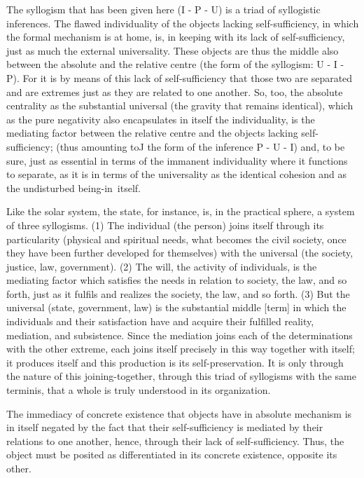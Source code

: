 The syllogism that has been given here (I - P - U)
is a triad of syllogistic inferences.
The flawed individuality of the objects lacking self-sufficiency,
in which the formal mechanism is at home, is,
in keeping with its lack of self-sufficiency,
just as much the external universality.
These objects are thus the middle also
between the absolute and the relative centre
(the form of the syllogism: U - I - P).
For it is by means of this lack of self-sufficiency
that those two are separated and are extremes
just as they are related to one another.
So, too, the absolute centrality as the substantial universal
(the gravity that remains identical),
which as the pure negativity also encapsulates in itself the individuality,
is the mediating factor between the relative centre
and the objects lacking self-sufficiency;
(thus amounting toJ the form of the inference P - U - I)
and, to be sure, just as essential
in terms of the immanent individuality
where it functions to separate,
as it is in terms of the universality
as the identical cohesion and
as the undisturbed being-in~itself.

Like the solar system, the state, for instance, is,
in the practical sphere, a system of three syllogisms.
(1) The individual (the person) joins itself through its particularity
(physical and spiritual needs, what becomes the civil society,
once they have been further developed for themselves)
with the universal (the society, justice, law, government).
(2) The will, the activity of individuals, is the mediating factor
which satisfies the needs in relation to society, the law, and so forth,
just as it fulfils and realizes the society, the law, and so forth.
(3) But the universal (state, government, law) is the substantial middle [term]
in which the individuals and their satisfaction have and acquire
their fulfilled reality, mediation, and subsistence.
Since the mediation joins each of the determinations with the other extreme,
each joins itself precisely in this way together with itself;
it produces itself and this production is its self-preservation.
It is only through the nature of this joining-together,
through this triad of syllogisms with the same terminis,
that a whole is truly understood in its organization.

The immediacy of concrete existence
that objects have in absolute mechanism
is in itself negated by the fact that
their self-sufficiency is mediated by
their relations to one another, hence,
through their lack of self-sufficiency.
Thus, the object must be posited as
differentiated in its concrete existence,
opposite its other.

